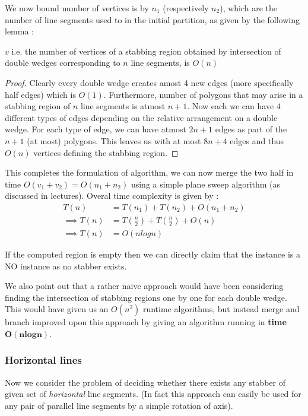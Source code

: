 We now bound number of vertices is by
$n_1$ (respectively $n_2$), which are the number of line segments used to in the initial partition, as given by the following lemma : 
\begin{lemma}
$v$ i.e. the number of vertices of a stabbing region obtained by intersection of double wedges corresponding to $n$ line segments, is $O(n)$
\end{lemma}
\begin{proof}
Clearly every double wedge creates amost 4 new edges (more specifically half edges) which is $O(1)$. Furthermore, number of polygons that may arise in a stabbing region of $n$ line segments is atmost $n+1$. Now each we can have $4$ different types of edges depending on the relative arrangement on a double wedge. For each type of edge, we can have atmost $2n+1$ edges as part of the $n+1$ (at most) polygons. This leaves us with at most $8n+4$ edges and thus $O(n) $ vertices defining the stabbing region.
\end{proof}

This completes the formulation of algorithm, we can now merge the two half in time $O(v_1+v_2) = O(n_1+n_2)$ using a simple plane sweep algorithm (as discussed in lectures). Overal time complexity is given by :
\begin{align*}
     T(n) &= T(n_1)+T(n_2)+O(n_1+n_2) \\
    \implies  T(n) &= T(\frac{n}{2}) + T(\frac{n}{2}) + O(n)\\
    \implies T(n) &= O(nlogn)
\end{align*}

If the computed region is empty then we can directly claim that the instance is a NO instance as no stabber exists.

We also point out that a rather naive approach would have been considering finding the intersection of stabbing regions one by one for each double wedge. This would have given us an $O(n^2)$ runtime algorithms, but instead merge and branch improved upon this approach by giving an algorithm running in \textbf{time} $\bm{O(nlogn)}$.


\subsubsection{Horizontal lines}
Now we consider the problem of deciding whether there exists any stabber of given set of \emph{horizontal} line segments. (In fact this approach can easily be used for any pair of parallel line segments by a simple rotation of axis).

